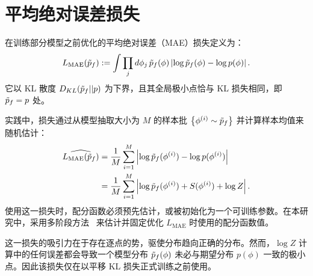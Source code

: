 \section{平均绝对误差损失}
\label{app:mae-loss}
在训练部分模型之前优化的平均绝对误差（MAE）损失定义为：
%
\begin{equation}
L_\text{MAE}(\tilde{p}_f) := \int \prod_j d\phi_j \, \tilde{p}_f(\phi) \left| \log{\tilde{p}_f(\phi)} - \log{p(\phi)} \right|.
\end{equation}
%
它以 KL 散度 $D_{KL}(\tilde{p}_f || p)$ 为下界，且其全局极小点恰与 KL 损失相同，即 $\tilde{p}_f = p$ 处。

实践中，损失通过从模型抽取大小为 $M$ 的样本批 $\left\{ \phi^{(i)} \sim \tilde{p}_f \right\}$ 并计算样本均值来随机估计：
%
\begin{equation}
\begin{aligned}
\widehat{L_\text{MAE}(\tilde{p}_f)} &= \frac{1}{M} \sum_{i=1}^M \left| \log{\tilde{p}_f(\phi^{(i)})} - \log{p(\phi^{(i)})} \right| \\
&= \frac{1}{M} \sum_{i=1}^M \left| \log{\tilde{p}_f(\phi^{(i)})} + S(\phi^{(i)}) + \log{Z} \right|.
\end{aligned}
\end{equation}
使用这一损失时，配分函数必须预先估计，或被初始化为一个可训练参数。在本研究中，采用多阶段方法~\cite{ValleauFreeEnergy72} 来估计并固定优化 $L_\text{MAE}$ 时使用的配分函数值。

\setlength{\parskip}{2pt}
这一损失的吸引力在于存在逐点的势，驱使分布趋向正确的分布。然而，$\log{Z}$ 计算中的任何误差都会导致一个模型分布 $\tilde{p}_f(\phi)$ 未必与期望分布 $p(\phi)$ 一致的极小点。因此该损失仅在以平移 KL 损失正式训练之前使用。


